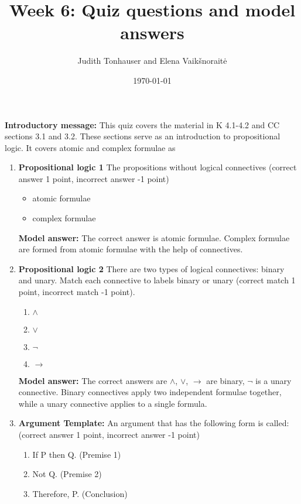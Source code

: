 \documentclass[a4,11pt]{article}
\title{Week 6: Quiz questions and model answers}
\author{Judith Tonhauser and Elena Vaik\v snorait\.{e} }
\date{\today}
\begin{document}
\maketitle

{\bf Introductory message:} This quiz covers the material in K 4.1-4.2 and CC sections 3.1 and 3.2. These sections serve as an introduction to propositional logic. It covers atomic and complex formulae as 

\begin{enumerate}[leftmargin = 12pt]

\item {\bf Propositional logic 1}
The propositions without logical connectives (correct answer 1 point, incorrect answer -1 point)

\begin{itemize}
\item atomic formulae
\item complex formulae
\end{itemize}

{\bf Model answer:} The correct answer is atomic formulae. Complex formulae are formed from atomic formulae with the help of connectives.


\item {\bf Propositional logic 2}
There are two types of logical connectives: binary and unary. Match each connective to labels binary or unary (correct match 1 point, incorrect match -1 point).

\begin{enumerate}[noitemsep]
\item $\land$
\item $\lor$
\item $\neg$
\item $\rightarrow$
\end{enumerate}

{\bf Model answer:} The correct answers are $\land$, $\lor$, $\rightarrow$ are binary, $\neg$ is a unary connective. Binary connectives apply two independent formulae together, while a unary connective applies to a single formula.


\item {\bf Argument Template:} An argument that has the following form is called: (correct answer 1 point, incorrect answer -1 point)

\begin{enumerate}[noitemsep]
\item[] If P then Q.  \hfill (Premise 1)
\item[] Not Q.  \hfill  (Premise 2)
\item[] Therefore, P. \hfill  (Conclusion)
\end{enumerate}


\end{enumerate}
\end{document}
